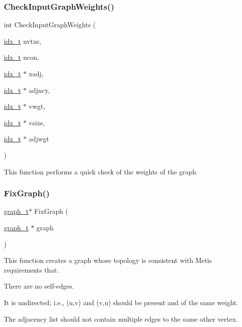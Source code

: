 \subsubsection{\texorpdfstring{Check\+Input\+Graph\+Weights()}{CheckInputGraphWeights()}}
{\footnotesize\ttfamily int Check\+Input\+Graph\+Weights (\begin{DoxyParamCaption}\item[{\hyperlink{a00876_aaa5262be3e700770163401acb0150f52}{idx\+\_\+t}}]{nvtxs,  }\item[{\hyperlink{a00876_aaa5262be3e700770163401acb0150f52}{idx\+\_\+t}}]{ncon,  }\item[{\hyperlink{a00876_aaa5262be3e700770163401acb0150f52}{idx\+\_\+t} $\ast$}]{xadj,  }\item[{\hyperlink{a00876_aaa5262be3e700770163401acb0150f52}{idx\+\_\+t} $\ast$}]{adjncy,  }\item[{\hyperlink{a00876_aaa5262be3e700770163401acb0150f52}{idx\+\_\+t} $\ast$}]{vwgt,  }\item[{\hyperlink{a00876_aaa5262be3e700770163401acb0150f52}{idx\+\_\+t} $\ast$}]{vsize,  }\item[{\hyperlink{a00876_aaa5262be3e700770163401acb0150f52}{idx\+\_\+t} $\ast$}]{adjwgt }\end{DoxyParamCaption})}

This function performs a quick check of the weights of the graph \mbox{\label{a00179_a681b2f4a615da39347c928c127760d07}} 
\subsubsection{\texorpdfstring{Fix\+Graph()}{FixGraph()}}
{\footnotesize\ttfamily \hyperlink{a00734}{graph\+\_\+t}$\ast$ Fix\+Graph (\begin{DoxyParamCaption}\item[{\hyperlink{a00734}{graph\+\_\+t} $\ast$}]{graph }\end{DoxyParamCaption})}

This function creates a graph whose topology is consistent with Metis\textquotesingle{} requirements that\+:
\begin{DoxyItemize}
\item There are no self-\/edges.
\item It is undirected; i.\+e., (u,v) and (v,u) should be present and of the same weight.
\item The adjacency list should not contain multiple edges to the same other vertex.
\end{DoxyItemize}


